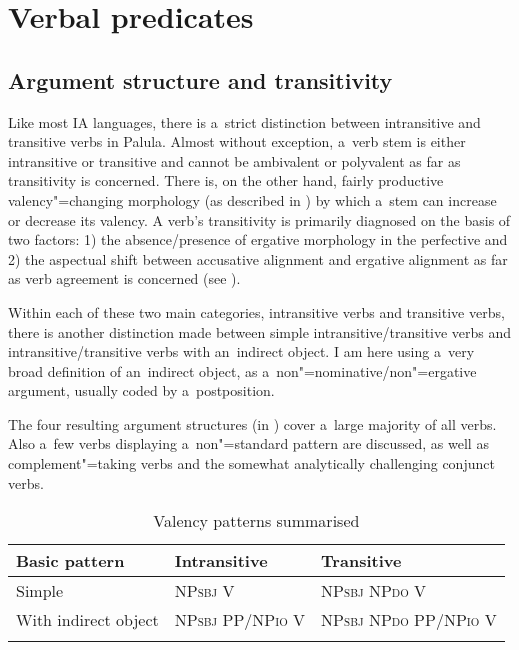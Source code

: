 \section{Verbal predicates}
\label{sec:12-2}

\subsection{Argument structure and transitivity}
\label{subsec:12-2-1}


Like most IA languages, there is a~strict distinction between intransitive and transitive verbs in Palula. Almost without exception, a~verb stem is either intransitive or transitive and cannot be ambivalent or polyvalent as far as transitivity is concerned. There is, on the other hand, fairly productive valency"=changing morphology (as described in ) by which a~stem can increase or decrease its valency. A verb's transitivity is primarily diagnosed on the basis of two factors: 1) the absence/presence of ergative morphology in the perfective and 2) the aspectual shift between accusative alignment and ergative alignment as far as verb agreement is concerned (see ). 


Within each of these two main categories, intransitive verbs and transitive verbs, there is another distinction made between simple intransitive/transitive verbs and intransitive/transitive verbs with an~indirect object. I am here using a~very broad definition of an~indirect object, as a~non"=nominative/non"=ergative argument, usually coded by a~postposition. 


The four resulting argument structures (in ) cover a~large majority of all verbs. Also a~few verbs displaying a~non"=standard pattern are discussed, as well as complement"=taking verbs and the somewhat analytically challenging conjunct verbs.


\begin{table}[ht]
\caption{Valency patterns summarised}

\begin{tabularx}{\textwidth}{ Q Q Q }
\lsptoprule
Basic pattern &
Intransitive &
Transitive\\\hline
Simple &
NP\textsc{sbj} V &
NP\textsc{sbj} NP\textsc{do} V\\
With indirect object &
NP\textsc{sbj} PP/NP\textsc{io} V &
NP\textsc{sbj} NP\textsc{do} PP/NP\textsc{io} V\\\lspbottomrule
\end{tabularx}
\label{tab:12-2}
\end{table}


